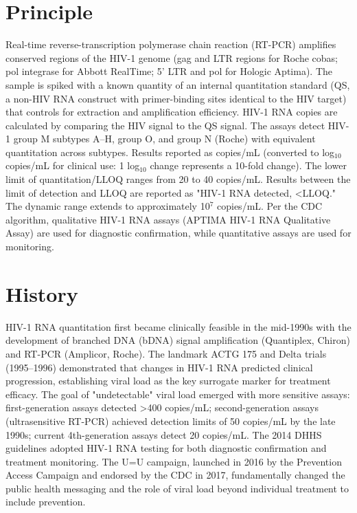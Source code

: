 \section*{Principle}
Real-time reverse-transcription polymerase chain reaction (RT-PCR) amplifies conserved regions of the HIV-1 genome (gag and LTR regions for Roche cobas; pol integrase for Abbott RealTime; 5' LTR and pol for Hologic Aptima). The sample is spiked with a known quantity of an internal quantitation standard (QS, a non-HIV RNA construct with primer-binding sites identical to the HIV target) that controls for extraction and amplification efficiency. HIV-1 RNA copies are calculated by comparing the HIV signal to the QS signal. The assays detect HIV-1 group M subtypes A--H, group O, and group N (Roche) with equivalent quantitation across subtypes. Results reported as copies/mL (converted to log$_{10}$ copies/mL for clinical use: 1 log$_{10}$ change represents a 10-fold change). The lower limit of quantitation/LLOQ ranges from 20 to 40 copies/mL. Results between the limit of detection and LLOQ are reported as "HIV-1 RNA detected, <LLOQ." The dynamic range extends to approximately 10$^7$ copies/mL. Per the CDC algorithm, qualitative HIV-1 RNA assays (APTIMA HIV-1 RNA Qualitative Assay) are used for diagnostic confirmation, while quantitative assays are used for monitoring.

\section*{History}
HIV-1 RNA quantitation first became clinically feasible in the mid-1990s with the development of branched DNA (bDNA) signal amplification (Quantiplex, Chiron) and RT-PCR (Amplicor, Roche). The landmark ACTG 175 and Delta trials (1995--1996) demonstrated that changes in HIV-1 RNA predicted clinical progression, establishing viral load as the key surrogate marker for treatment efficacy. The goal of "undetectable" viral load emerged with more sensitive assays: first-generation assays detected >400 copies/mL; second-generation assays (ultrasensitive RT-PCR) achieved detection limits of 50 copies/mL by the late 1990s; current 4th-generation assays detect 20 copies/mL. The 2014 DHHS guidelines adopted HIV-1 RNA testing for both diagnostic confirmation and treatment monitoring. The U=U campaign, launched in 2016 by the Prevention Access Campaign and endorsed by the CDC in 2017, fundamentally changed the public health messaging and the role of viral load beyond individual treatment to include prevention.

